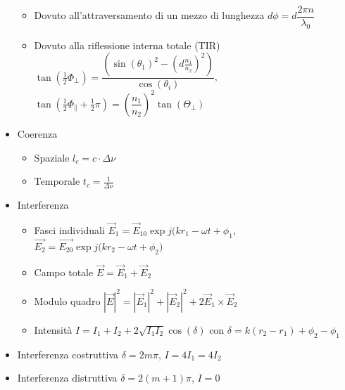 \documentclass{article}
\begin{document}
\begin{itemize}
\begin{itemize}
		\item Dovuto all'attraversamento di un mezzo di lunghezza \( d \phi = d \dfrac{2 \pi n}{\lambda_0} \)
		\item Dovuto alla riflessione interna totale (TIR) \( \tan\left(\frac{1}{2} \Phi_\perp\right) = \dfrac{\left(\sin(\theta_1)^2 - ( d\frac{n_1}{n_2})^2 \right)}{\cos(\theta_i)} \), \( \tan(\frac{1}{2} \Phi_\parallel + \frac{1}{2} \pi) = (\dfrac{n_1}{n_2})^2 \tan(\Theta_\perp) \) 
	\end{itemize}
	\item Coerenza
	\begin{itemize}
		\item Spaziale \( l_c = c \cdot \Delta \nu \)
		\item Temporale \( t_c = \frac{1}{\Delta \nu} \)
	\end{itemize}
	\item Interferenza
	\begin{itemize}
		\item Fasci individuali \( \vec{E}_1 = \vec{E}_{10} \exp{j (k r_1 - \omega t + \phi_1} \), \( \vec{E_2} = \vec{E_{20}} \exp{j (k r_2 - \omega t + \phi_2}) \)
		\item Campo totale \( \vec{E} = \vec{E}_1 + \vec{E}_2 \)
		\item Modulo quadro \(  |\vec{E}| ^ 2 = |\vec{E}_1| ^ 2 + |\vec{E}_2| ^ 2 + 2 \vec{E}_1 \times \vec{E}_2 \)
		\item Intensità \(  I = I_1 + I_2 + 2 \sqrt{I_1 I_2} \cos(\delta) \) con \( \delta = k(r_2 - r_1) + \phi_2 - \phi_1 \)
	\end{itemize}
	\item Interferenza costruttiva \( \delta = 2m\pi\), \(I = 4 I_1 = 4 I_2 \)
	\item Interferenza distruttiva \( \delta = 2(m + 1)\pi\), \(I = 0 \)
\end{itemize}
\end{document}
